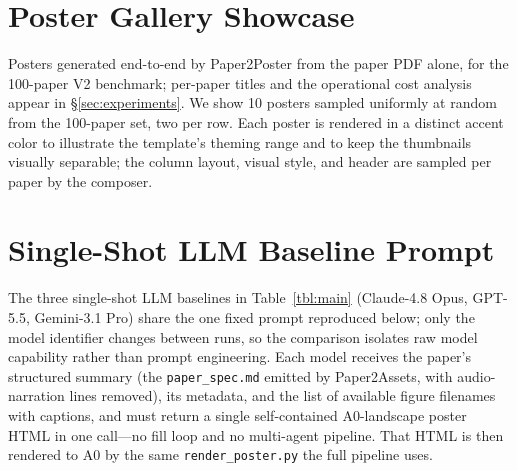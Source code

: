 \documentclass{article}
\begin{document}
\section{Poster Gallery Showcase}\label{app:gallery}
Posters generated end-to-end by Paper2Poster from the paper PDF alone, for the 100-paper V2 benchmark; per-paper titles and the operational cost analysis appear in \S\ref{sec:experiments}. We show 10 posters sampled uniformly at random from the 100-paper set, two per row. Each poster is rendered in a distinct accent color to illustrate the template's theming range and to keep the thumbnails visually separable; the column layout, visual style, and header are sampled per paper by the composer.



\clearpage

\section{Single-Shot LLM Baseline Prompt}\label{app:llm-prompt}
The three single-shot LLM baselines in Table~\ref{tbl:main} (Claude-4.8 Opus, GPT-5.5, Gemini-3.1 Pro) share the one fixed prompt reproduced below; only the model identifier changes between runs, so the comparison isolates raw model capability rather than prompt engineering. Each model receives the paper's structured summary (the \texttt{paper\_spec.md} emitted by Paper2Assets, with audio-narration lines removed), its metadata, and the list of available figure filenames with captions, and must return a single self-contained A0-landscape poster HTML in one call---no fill loop and no multi-agent pipeline. That HTML is then rendered to A0 by the same \texttt{render\_poster.py} the full pipeline uses.
\end{document}
